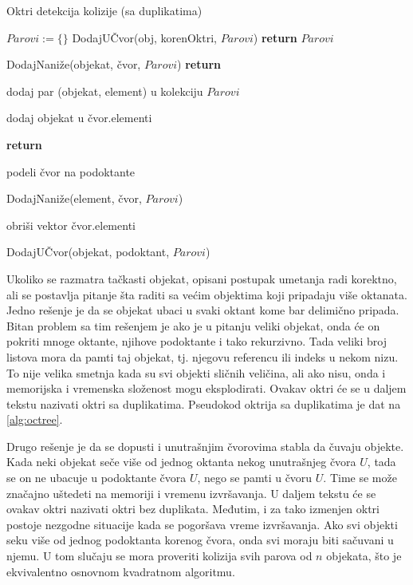 \documentclass[12pt,oneside]{memoir}
\begin{document}
\begin{algorithm}
	\caption{Oktri detekcija kolizije (sa duplikatima)}
    \label{alg:octree}
	\begin{algorithmic}[1]
		\State $Parovi := \{ \}$
			\State DodajUČvor(obj, korenOktri, $Parovi$)
		\EndFor
		\State \textbf{return} $Parovi$
		\EndProcedure

			\State DodajNaniže(objekat, čvor, $Parovi$)
			\State \textbf{return}
		\EndIf		

				\State dodaj par (objekat, element) u kolekciju $Parovi$
			\EndIf		
		\EndFor

		\State dodaj objekat u čvor.elementi

			\State \textbf{return}
		\EndIf	

		\State podeli čvor na podoktante

			\State DodajNaniže(element, čvor, $Parovi$)
		\EndFor

		\State obriši vektor čvor.elementi

		\EndProcedure

				\State DodajUČvor(objekat, podoktant, $Parovi$)
			\EndIf	
		\EndFor
		\EndProcedure
    \end{algorithmic}
\end{algorithm}

Ukoliko se razmatra tačkasti objekat, opisani postupak umetanja radi korektno,
ali se postavlja pitanje šta raditi sa većim objektima koji pripadaju više oktanata.
Jedno rešenje je da se objekat ubaci u svaki oktant kome bar delimično pripada.
Bitan problem sa tim rešenjem je ako je u pitanju veliki objekat, onda će on pokriti mnoge oktante, njihove 
podoktante i tako rekurzivno. 
Tada veliki broj listova mora da pamti taj objekat, tj. njegovu referencu ili indeks u nekom nizu.
To nije velika smetnja kada su svi objekti sličnih veličina, ali ako 
nisu, onda i memorijska i vremenska složenost mogu eksplodirati.
Ovakav oktri će se u daljem tekstu nazivati oktri sa duplikatima. 
Pseudokod oktrija sa duplikatima je dat na \ref{alg:octree}.

Drugo rešenje je da se dopusti i unutrašnjim čvorovima stabla da čuvaju objekte.
Kada neki objekat seče više od jednog oktanta nekog unutrašnjeg čvora $U$, tada se on ne ubacuje 
u podoktante čvora $U$, nego se pamti u čvoru $U$. Time se može značajno uštedeti na memoriji i vremenu izvršavanja.
U daljem tekstu će se ovakav oktri nazivati oktri bez duplikata.
Međutim, i za tako izmenjen oktri postoje nezgodne situacije kada se pogoršava vreme izvršavanja.
Ako svi objekti seku više od jednog podoktanta korenog čvora, onda svi moraju biti sačuvani u njemu. 
U tom slučaju se mora proveriti kolizija svih parova od $n$ objekata, što je ekvivalentno osnovnom kvadratnom algoritmu.
\end{document}
